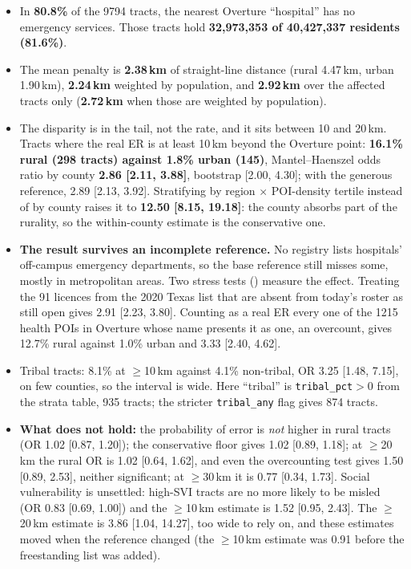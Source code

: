 \documentclass[a4paper]{article}
\begin{document}
\begin{itemize}
\item In \textbf{80.8\%} of the \num{9794} tracts, the nearest Overture ``hospital'' has no
emergency services. Those tracts hold \textbf{32,973,353 of 40,427,337 residents (81.6\%)}.
\item The mean penalty is \textbf{2.38\,km} of straight-line distance (rural 4.47\,km, urban
1.90\,km), \textbf{2.24\,km} weighted by population, and \textbf{2.92\,km} over the affected tracts
only (\textbf{2.72\,km} when those are weighted by population).
\item The disparity is in the tail, not the rate, and it sits between 10 and 20\,km. Tracts where
the real ER is at least 10\,km beyond the Overture point: \textbf{16.1\% rural (298 tracts) against
1.8\% urban (145)}, Mantel--Haenszel odds ratio by county \textbf{2.86 [2.11, 3.88]}, bootstrap
[2.00, 4.30]; with the generous reference, 2.89 [2.13, 3.92]. Stratifying by region $\times$
POI-density tertile instead of by county raises it to \textbf{12.50 [8.15, 19.18]}: the county
absorbs part of the rurality, so the within-county estimate is the conservative one.
\item \textbf{The result survives an incomplete reference.} No registry lists hospitals' off-campus
emergency departments, so the base reference still misses some, mostly in metropolitan areas. Two stress tests
() measure the effect. Treating the 91
licences from the 2020 Texas list that are absent from today's roster as still open gives 2.91
[2.23, 3.80]. Counting as a real ER every one of the \num{1215} health POIs in Overture whose name
presents it as one, an overcount, gives 12.7\% rural against 1.0\% urban and 3.33
[2.40, 4.62].
\item Tribal tracts: 8.1\% at $\ge$10\,km against 4.1\% non-tribal, OR 3.25 [1.48, 7.15], on few
counties, so the interval is wide.
Here ``tribal'' is \texttt{tribal\_pct}$>0$ from the strata table, \num{935} tracts; the
stricter \texttt{tribal\_any} flag gives \num{874} tracts.
\item \textbf{What does not hold:} the probability of error is \emph{not} higher in rural
tracts (OR 1.02 [0.87, 1.20]); the conservative floor gives 1.02 [0.89, 1.18]; at $\ge$20\,km
the rural OR is 1.02 [0.64, 1.62], and even the overcounting test gives 1.50 [0.89, 2.53], neither
significant; at $\ge$30\,km it is 0.77 [0.34, 1.73]. Social vulnerability is unsettled: high-SVI
tracts are no more likely to be misled (OR 0.83 [0.69, 1.00]) and the $\ge$10\,km estimate is 1.52
[0.95, 2.43]. The $\ge$20\,km estimate is 3.86 [1.04, 14.27], too wide to rely on, and these estimates moved
when the reference changed (the $\ge$10\,km estimate was 0.91 before the freestanding list was added).
\end{itemize}
\end{document}
